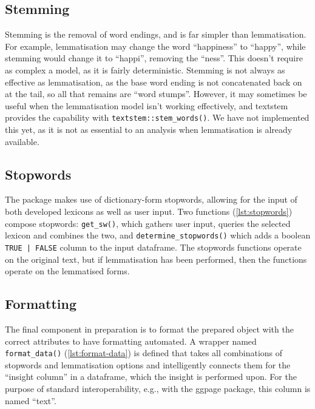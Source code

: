\message{ !name(jason-cairns-dissertation.tex)}\documentclass[11pt, a4paper, titlepage]{report}
\begin{document}
\subsection{Stemming}

Stemming is the removal of word endings, and is far simpler than
lemmatisation. For example, lemmatisation may change the word
``happiness'' to ``happy'', while stemming would change it to
``happi'', removing the ``ness''. This doesn't require as complex a
model, as it is fairly deterministic. Stemming is not always as
effective as lemmatisation, as the base word ending is not
concatenated back on at the tail, so all that remains are ``word
stumps''. However, it may sometimes be useful when the lemmatisation
model isn't working effectively, and textstem provides the capability
with \texttt{textstem::stem_words()}. We have not implemented
this yet, as it is not as essential to an analysis when lemmatisation
is already available.

\subsection{Stopwords}\label{sec:stopwords}

The package makes use of dictionary-form stopwords, allowing for the
input of both developed lexicons as well as user input. Two functions
(\cref{lst:stopwords}) compose stopwords: \texttt{get_sw()},
which gathers user input, queries the selected lexicon and combines
the two, and \texttt{determine_stopwords()} which adds a
boolean \texttt{TRUE | FALSE} column to the input dataframe.
The stopwords functions operate on the original text, but if
lemmatisation has been performed, then the functions operate on the
lemmatised forms.

\subsection{Formatting}\label{sec:formatting}

The final component in preparation is to format the prepared object
with the correct attributes to have formatting automated. A wrapper
named \texttt{format_data()} (\cref{lst:format-data}) is
defined that takes all combinations of stopwords and lemmatisation
options and intelligently connects them for the ``insight column'' in
a dataframe, which the insight is performed upon. For the purpose of
standard interoperability, e.g., with the ggpage package, this column
is named ``text''.
\end{document}
